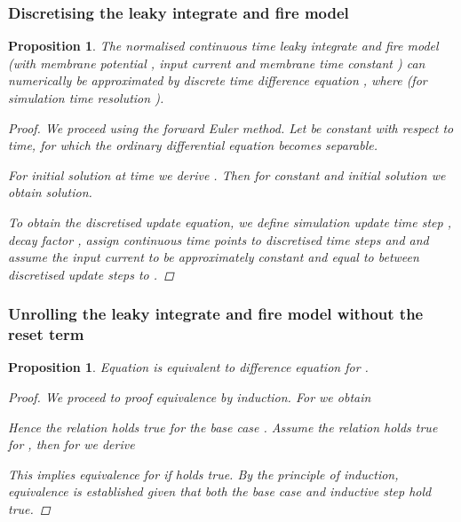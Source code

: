 \documentclass{article} \usepackage{iclr2023_conference,times}
\newtheorem{proposition}[theorem]{Proposition}
\begin{document}
\subsubsection{Discretising the leaky integrate and fire model}

\begin{proposition}
The normalised continuous time leaky integrate and fire model  (with membrane potential , input current  and membrane time constant ) can numerically be approximated by discrete time difference equation , where  (for simulation time resolution ).
\begin{proof}
We proceed using the forward Euler method. Let  be constant with respect to time, for which the ordinary differential equation becomes separable.



For initial solution  at time  we derive . Then for constant  and initial solution  we obtain solution. 



To obtain the discretised update equation, we define simulation update time step , decay factor , assign continuous time points to discretised time steps  and  and assume the input current to be approximately constant and equal to  between discretised update steps  to .



\end{proof}
\end{proposition}

\subsubsection{Unrolling the leaky integrate and fire model without the reset term}

\begin{proposition}
Equation  is equivalent to difference equation  for .
\begin{proof}	
We proceed to proof equivalence by induction. For  we obtain



Hence the relation holds true for the base case . Assume the relation holds true for , then for  we derive



This implies equivalence for  if  holds true. By the principle of induction, equivalence is established given that both the base case and inductive step hold true.

\end{proof}
\end{proposition}
\end{document}
